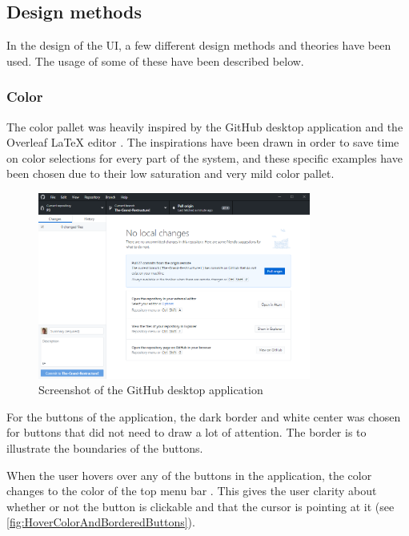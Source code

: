 \subsection{Design methods}
In the design of the UI, a few different design methods and theories have been used. The usage of some of these have been described below.

\subsubsection*{Color}
The color pallet was heavily inspired by the GitHub desktop application and the Overleaf LaTeX editor \citep{GithubDesktop}. The inspirations have been drawn in order to save time on color selections for every part of the system, and these specific examples have been chosen due to their low saturation and very mild color pallet.

\begin{figure}[H]
    \centering
    \includegraphics[width=0.8\textwidth]{figures/UIDesignElements/GitHub_Desktop_Screenshot.png}
    \caption{Screenshot of the GitHub desktop application \citep{GithubDesktop}}
    \label{fig:GitHubDesktop}
\end{figure}

For the buttons of the application, the dark border and white center was chosen for buttons that did not need to draw a lot of attention. The border is to illustrate the boundaries of the buttons.
\par
When the user hovers over any of the buttons in the application, the color changes to the color of the top menu bar . This gives the user clarity about whether or not the button is clickable and that the cursor is pointing at it (see \autoref{fig:HoverColorAndBorderedButtons}).

